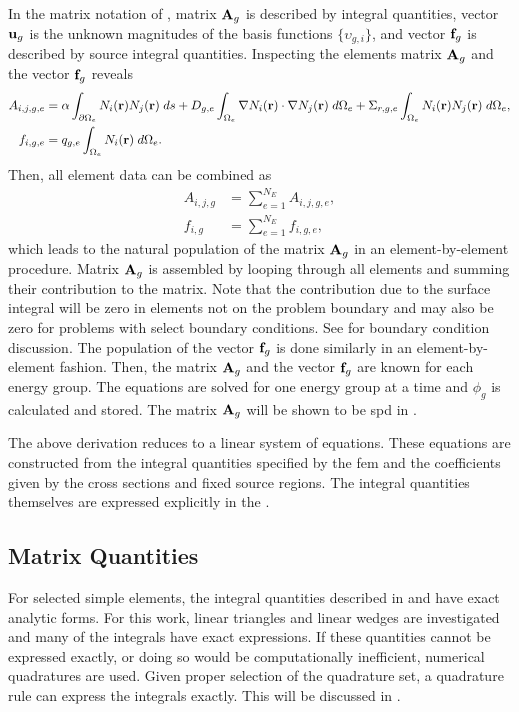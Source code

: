     In the matrix notation of , matrix $\mathbf{A}_g$ is 
    described by integral quantities, vector $\mathbf{u}_g$ is the unknown magnitudes 
    of the basis functions $\{\upsilon_{g,i}\}$, and vector $\mathbf{f}_g$ is described
    by source integral quantities. Inspecting the elements matrix $\mathbf{A}_g$ and
    the vector $\mathbf{f}_g$ reveals 
    \begin{align}
      \label{eq:matrix_population}
      A_{i,j,g,e} &= \alpha \int_{\partial \Omega_e} N_i(\mathbf{r}) 
        N_j(\mathbf{r}) \; ds + D_{g,e} 
        \int_{\Omega_e} \mathbf{\nabla} N_i(\mathbf{r}) \cdot \mathbf{\nabla} N_j(\mathbf{r}) \;
        d\Omega_e + \Sigma_{r,g,e} \int_{\Omega_e} N_i(\mathbf{r}) N_j(\mathbf{r})
        \; d\Omega_e, \\
      \label{eq:vector_population}
      f_{i,g,e} &= q_{g,e} \int_{\Omega_e} N_i(\mathbf{r}) \;d\Omega_e.
    \end{align}
    Then, all element data can be combined as
    \begin{align}
      A_{i,j,g} &= \sum_{e=1}^{N_E} A_{i,j,g,e}, \\
      f_{i,g} &=  \sum_{e=1}^{N_E} f_{i,g,e},
    \end{align}
    which leads to the natural population of the matrix $\mathbf{A}_g$ in an
    element-by-element procedure. Matrix $\mathbf{A}_g$ is assembled by looping through
    all elements and summing their contribution to the matrix. Note that the
    contribution due to the surface integral will be zero in elements not on the
    problem boundary and may also be zero for problems with select boundary
    conditions. See  for boundary condition
    discussion. The population of the vector $\mathbf{f}_g$ is done similarly in an
    element-by-element fashion. Then, the matrix $\mathbf{A}_g$ and the vector $\mathbf{f}_g$
    are known for each energy group. The equations are solved for one energy
    group at a time and $\phi_g$ is calculated and stored. The matrix $\mathbf{A}_g$
    will be shown to be \gls{spd} in .
    
    The above derivation reduces to a linear system of equations. These
    equations are constructed from the integral quantities specified by the
    \gls{fem} and the coefficients given by the cross sections and fixed source
    regions. The integral quantities themselves are expressed explicitly in the
    .
    
  \subsection{Matrix Quantities}
    \label{sec:matrix_quantities}
    For selected simple elements, the integral quantities described in 
     and  have exact 
    analytic forms. For this work, linear triangles and linear wedges
    are investigated and many of the integrals have exact expressions. If these 
    quantities cannot be expressed exactly, or doing so would be computationally
    inefficient, numerical quadratures are used. Given proper selection of
    the quadrature set, a quadrature rule can express the integrals exactly. 
    This will be discussed in .

